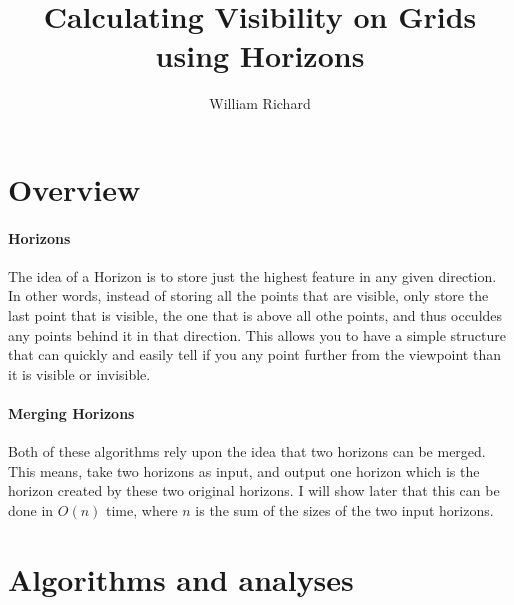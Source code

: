 \documentclass[11pt,twocolumn]{article}
\begin{document}
\title{Calculating Visibility on Grids using Horizons}
\author{William Richard}
\maketitle 



\section{Overview}

\paragraph{Horizons}
The idea of a Horizon is to store just the highest feature in any given direction.  In other words, instead of storing all the points that are visible, only store the last point that is visible, the one that is above all othe points, and thus occuldes any points behind it in that direction.  This allows you to have a simple structure that can quickly and easily tell if you any point further from the viewpoint than it is visible or invisible.

\paragraph{Merging Horizons}
Both of these algorithms rely upon the idea that two horizons can be merged.  This means, take two horizons as input, and output one horizon which is the horizon created by these two original horizons.  I will show later that this can be done in $O(n)$ time, where $n$ is the sum of the sizes of the two input horizons.

\section{Algorithms and analyses}
\end{document}
